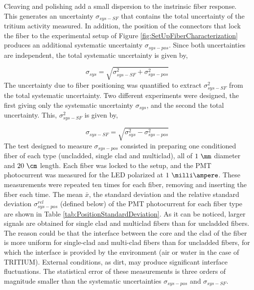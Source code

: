 Cleaving and polishing add a small dispersion to the instrinsic fiber response. This generates an uncertainty $\sigma_{sys-SF}$ that contains the total uncertainty of the tritium activity measured. In addition, the position of the connectors that lock the fiber to the experimental setup of Figure \ref{fig:SetUpFiberCharacterization} produces an additional systematic uncertainty $\sigma_{sys-pos}$. Since both uncertainties are independent, the total systematic uncertainty is given by,

\begin{equation}
\sigma_{sys} = \sqrt{\sigma^2_{sys-SF} + \sigma^2_{sys-pos} }
\label{eq:TotalUncertaintyFiberCharacterization}
\end{equation}
The uncertainty due to fiber positioning was quantified to extract $\sigma^2_{sys-SF}$ from the total systematic uncertainty. Two different experiments were designed, the first giving only the systematic uncertainty $\sigma_{sys}$, and the second the total uncertainty. This, $\sigma^2_{sys-SF}$ is given by,

\begin{equation}
\sigma_{sys-SF} = \sqrt{\sigma^2_{sys} - \sigma^2_{sys-pos} }
\label{eq:TMUncertaintyFiberCharacterization}
\end{equation}
The test designed to measure $\sigma_{sys-pos}$ consisted in preparing one conditioned fiber of each type (uncladded, single clad and multiclad), all of $1~\mm$ diameter and $20~\cm$ length. Each fiber was locked to the setup, and the PMT photocurrent was measured for the LED polarized at $1~\milli\ampere$. These measurements were repeated ten times for each fiber, removing and inserting the fiber each time. The mean $\bar{x}$, the standard deviation  and the relative standard deviation $\sigma^{rel}_{sys-pos}$ (defined below) of the PMT photocurrent for each fiber type are shown in Table \ref{tab:PositionStandardDeviation}. As it can be noticed, larger signals are obtained for single clad and multiclad fibers than for uncladded fibers. The reason could be that the interface between the core and the clad of the fiber is more uniform for single-clad and multi-clad fibers than for uncladded fibers, for which the interface is provided by the environment (air or water in the case of TRITIUM). External conditions, as dirt, may produce significant interface fluctuations. The statistical error of these measurements is three orders of magnitude smaller than the systematic uncertainties $\sigma_{sys-pos}$ and $\sigma_{sys-SF}$.

